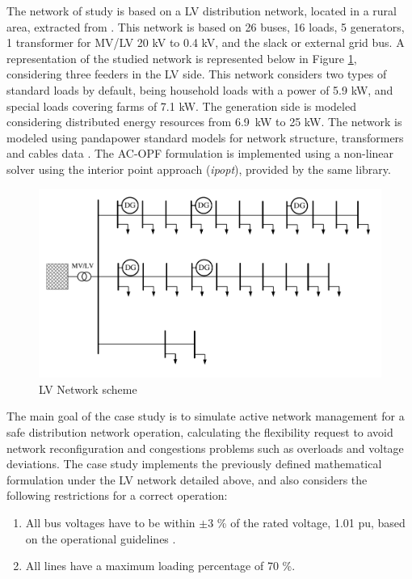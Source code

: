 The network of study is based on a LV distribution network, located in a rural area, extracted from \cite{Linder2014}. This network is based on 26 buses, 16 loads, 5 generators, 1 transformer for MV/LV 20 kV to 0.4 kV, and the slack or external grid bus. A representation of the studied network is represented below in Figure \ref{fig:case_study_LV}, considering three feeders in the LV side. 
This network considers two types of standard loads by default, being household loads with a power of 5.9 kW, and special loads covering farms of 7.1 kW. The generation side is modeled considering distributed energy resources from 6.9~kW to 25 kW. The network is modeled using pandapower standard models for network structure, transformers and cables data \cite{Thurner_2018}. The AC-OPF formulation is implemented using a non-linear solver using the interior point approach (\textit{ipopt}), provided by the same library. 
\vspace{10mm}
\begin{figure}[htbp]
	\centering
	\includegraphics[width=1\columnwidth ]{ChapterOPF_DSO/Figures/LV_network_2.pdf}
		\caption{LV Network scheme}
	\label{fig:case_study_LV}  
\end{figure}

The main goal of the case study is to simulate active network management for a safe distribution network operation, calculating the flexibility request to avoid network reconfiguration and congestions problems such as overloads and voltage deviations. The case study implements the previously defined mathematical formulation under the LV network detailed above, and also considers the following restrictions for a correct operation: 

\begin{enumerate}
\item All bus voltages have to be within $\pm 3$ \% of the rated voltage, 1.01 pu, based on the operational guidelines \cite{BAYER2020336, Giannelos2016}.
\item All lines have a maximum loading percentage of 70 \%. 
\end{enumerate}

